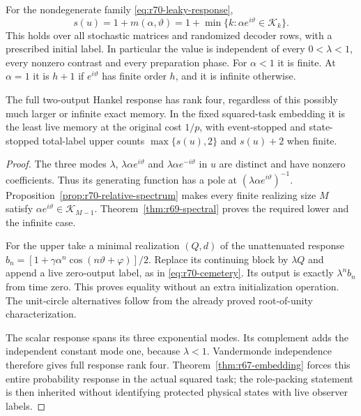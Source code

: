 \begin{theorem}\label{thm:r70-leakage}
For the nondegenerate family \eqref{eq:r70-leaky-response},
\begin{equation}\label{eq:r70-exact}
 s(u)=1+m(\alpha,\vartheta)
     =1+\min\{k:\alpha e^{i\vartheta}\in\mathcal K_k\}.
\end{equation}
This holds over all stochastic matrices and randomized decoder rows, with a prescribed initial label. In particular the value is independent of every $0<\lambda<1$, every nonzero contrast and every preparation phase. For $\alpha<1$ it is finite. At $\alpha=1$ it is $h+1$ if $e^{i\vartheta}$ has finite order $h$, and it is infinite otherwise.

The full two-output Hankel response has rank four, regardless of this possibly much larger or infinite exact memory. In the fixed squared-task embedding it is the least live memory at the original cost $1/p$, with event-stopped and state-stopped total-label upper counts $\max\{s(u),2\}$ and $s(u)+2$ when finite.
\end{theorem}
\begin{proof}
The three modes $\lambda$, $\lambda\alpha e^{i\vartheta}$ and $\lambda\alpha e^{-i\vartheta}$ in $u$ are distinct and have nonzero coefficients. Thus its generating function has a pole at $(\lambda\alpha e^{i\vartheta})^{-1}$. Proposition~\ref{prop:r70-relative-spectrum} makes every finite realizing size $M$ satisfy $\alpha e^{i\vartheta}\in\mathcal K_{M-1}$. Theorem~\ref{thm:r69-spectral} proves the required lower and the infinite case.

For the upper take a minimal realization $(Q,d)$ of the unattenuated response
$b_n=[1+\gamma\alpha^n\cos(n\vartheta+\varphi)]/2$.
Replace its continuing block by $\lambda Q$ and append a live zero-output label, as in \eqref{eq:r70-cemetery}. Its output is exactly $\lambda^nb_n$ from time zero. This proves equality without an extra initialization operation. The unit-circle alternatives follow from the already proved root-of-unity characterization.

The scalar response spans its three exponential modes. Its complement adds the independent constant mode one, because $\lambda<1$. Vandermonde independence therefore gives full response rank four. Theorem~\ref{thm:r67-embedding} forces this entire probability response in the actual squared task; the role-packing statement is then inherited without identifying protected physical states with live observer labels.
\end{proof}

